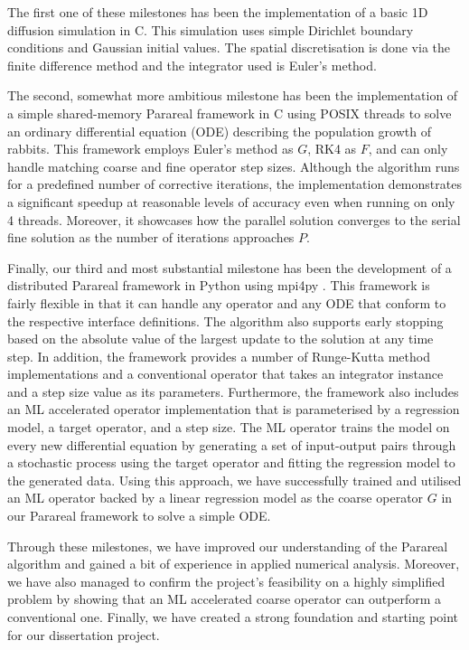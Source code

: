 \documentclass{article}
\begin{document}
The first one of these milestones has been the implementation of a basic 1D diffusion simulation in C. This simulation uses simple Dirichlet boundary conditions and Gaussian initial values. The spatial discretisation is done via the finite difference method and the integrator used is Euler's method.

The second, somewhat more ambitious milestone has been the implementation of a simple shared-memory Parareal framework in C using POSIX threads to solve an ordinary differential equation (ODE) describing the population growth of rabbits. This framework employs Euler's method as $G$, RK4 as $F$, and can only handle matching coarse and fine operator step sizes. Although the algorithm runs for a predefined number of corrective iterations, the implementation demonstrates a significant speedup at reasonable levels of accuracy even when running on only 4 threads. Moreover, it showcases how the parallel solution converges to the serial fine solution as the number of iterations approaches $P$.

Finally, our third and most substantial milestone has been the development of a distributed Parareal framework in Python using mpi4py \cite{dalcin2005}. This framework is fairly flexible in that it can handle any operator and any ODE that conform to the respective interface definitions. The algorithm also supports early stopping based on the absolute value of the largest update to the solution at any time step. In addition, the framework provides a number of Runge-Kutta method implementations and a conventional operator that takes an integrator instance and a step size value as its parameters. Furthermore, the framework also includes an ML accelerated operator implementation that is parameterised by a regression model, a target operator, and a step size. The ML operator trains the model on every new differential equation by generating a set of input-output pairs through a stochastic process using the target operator and fitting the regression model to the generated data. Using this approach, we have successfully trained and utilised an ML operator backed by a linear regression model as the coarse operator $G$ in our Parareal framework to solve a simple ODE.

Through these milestones, we have improved our understanding of the Parareal algorithm and gained a bit of experience in applied numerical analysis. Moreover, we have also managed to confirm the project's feasibility on a highly simplified problem by showing that an ML accelerated coarse operator can outperform a conventional one. Finally, we have created a strong foundation and starting point for our dissertation project.
\end{document}
